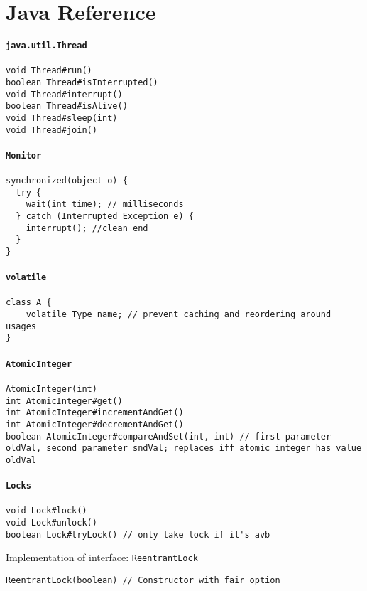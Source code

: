 \section{Java Reference}
\paragraph{\texttt{java.util.Thread}}
\begin{verbatim}
void Thread#run()
boolean Thread#isInterrupted()
void Thread#interrupt()
boolean Thread#isAlive()
void Thread#sleep(int)
void Thread#join()
\end{verbatim}
\paragraph{\texttt{Monitor}}
\begin{verbatim}
synchronized(object o) {
  try {
    wait(int time); // milliseconds
  } catch (Interrupted Exception e) {
    interrupt(); //clean end
  }
}
\end{verbatim}
\paragraph{\texttt{volatile}}
\begin{verbatim}
class A {
    volatile Type name; // prevent caching and reordering around usages
}
\end{verbatim}
\paragraph{\texttt{AtomicInteger}}
\begin{verbatim}
AtomicInteger(int)
int AtomicInteger#get()
int AtomicInteger#incrementAndGet()
int AtomicInteger#decrementAndGet()
boolean AtomicInteger#compareAndSet(int, int) // first parameter oldVal, second parameter sndVal; replaces iff atomic integer has value oldVal
\end{verbatim}
\paragraph{\texttt{Locks}}
\begin{verbatim}
void Lock#lock()
void Lock#unlock()
boolean Lock#tryLock() // only take lock if it's avb
\end{verbatim}
Implementation of interface: \texttt{ReentrantLock}
\begin{verbatim}
ReentrantLock​(boolean) // Constructor with fair option
\end{verbatim}
